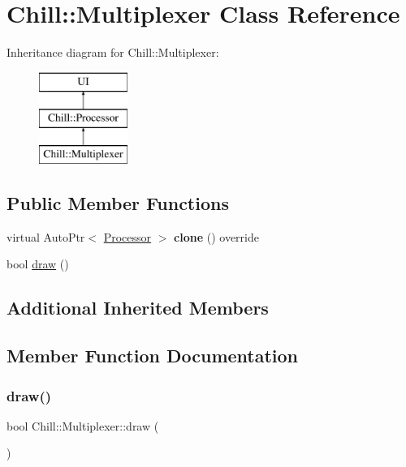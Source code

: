 \hypertarget{class_chill_1_1_multiplexer}{}\section{Chill\+:\+:Multiplexer Class Reference}
\label{class_chill_1_1_multiplexer}
Inheritance diagram for Chill\+:\+:Multiplexer\+:\begin{figure}[H]
\begin{center}
\leavevmode
\includegraphics[height=3.000000cm]{class_chill_1_1_multiplexer}
\end{center}
\end{figure}
\subsection*{Public Member Functions}
\begin{DoxyCompactItemize}
\item 
\mbox{\label{class_chill_1_1_multiplexer_a8320698e871a005ad9a5c1fbe00082e7}} 
virtual Auto\+Ptr$<$ \mbox{\hyperlink{class_chill_1_1_processor}{Processor}} $>$ {\bfseries clone} () override
\item 
bool \mbox{\hyperlink{class_chill_1_1_multiplexer_aac8cf52a617091ffedaee970b5550270}{draw}} ()
\end{DoxyCompactItemize}
\subsection*{Additional Inherited Members}


\subsection{Member Function Documentation}
\mbox{\label{class_chill_1_1_multiplexer_aac8cf52a617091ffedaee970b5550270}} 
\subsubsection{\texorpdfstring{draw()}{draw()}}
{\footnotesize\ttfamily bool Chill\+::\+Multiplexer\+::draw (\begin{DoxyParamCaption}{ }\end{DoxyParamCaption})\hspace{0.3cm}{\ttfamily [virtual]}}

